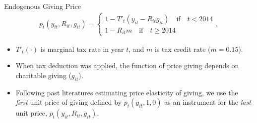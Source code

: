 \documentclass[
  ignorenonframetext,
  aspectratio=169,
]{beamer}
\providecommand{\tightlist}{%
  \setlength{\itemsep}{0pt}\setlength{\parskip}{0pt}}
\begin{document}
\begin{frame}{Endogenous Giving Price}
\protect\hypertarget{endogenous-giving-price}{}
\begin{align}
  p_t(y_{it}, R_{it}, g_{it}) =
  \begin{cases}
    1 - T'_t(y_{it} - R_{it} g_{it})  \quad\text{if}\quad t < 2014  \\
    1 - R_{it} m \quad\text{if}\quad t \ge 2014
  \end{cases},
\end{align}

\begin{itemize}
\tightlist
\item
  \(T'_t(\cdot)\) is marginal tax rate in year \(t\), and \(m\) is tax credit rate (\(m = 0.15\)).
\item
  When tax deduction was applied, the function of price giving depends on charitable giving (\(g_{it}\)).
\item
  Following past literatures estimating price elasticity of giving, we use the \emph{first}-unit price of giving defined by \(p_t(y_{it}, 1, 0)\) as an instrument for the \emph{last}-unit price, \(p_t(y_{it}, R_{it}, g_{it})\).
\end{itemize}
\end{frame}
\end{document}
